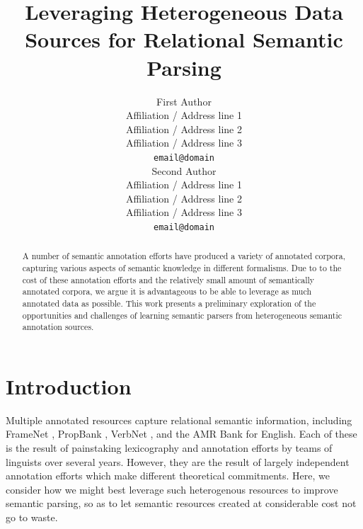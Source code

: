 \documentclass[11pt]{article}
\title{Leveraging Heterogeneous Data Sources for Relational Semantic Parsing}
\author{First Author \\
  Affiliation / Address line 1 \\
  Affiliation / Address line 2 \\
  Affiliation / Address line 3 \\
  {\tt email@domain} \\\And
  Second Author \\
  Affiliation / Address line 1 \\
  Affiliation / Address line 2 \\
  Affiliation / Address line 3 \\
  {\tt email@domain} \\}
\date{}
\begin{document}
\maketitle
\begin{abstract}
A number of semantic annotation efforts have produced a variety of annotated corpora, capturing various aspects of semantic knowledge in different formalisms. Due to to the cost of these annotation efforts and the relatively small amount of semantically annotated corpora, we argue it is advantageous to be able to leverage as much annotated data as possible. This work presents a preliminary exploration of the opportunities and challenges of learning semantic parsers from heterogeneous semantic annotation sources. 
\end{abstract}

\section{Introduction}
Multiple annotated resources capture relational semantic information, including FrameNet \citep{framenet}, PropBank \citep{propbank}, 
VerbNet \citep{vnet}, and the AMR Bank \citep{amr} for English. 
Each of these is the result of painstaking lexicography and annotation efforts by teams of linguists over several years. 
However, they are the result of largely independent annotation efforts which make different theoretical commitments. 
Here, we consider how we might best leverage such heterogenous resources to improve semantic parsing, 
so as to let semantic resources created at considerable cost not go to waste.
\end{document}
